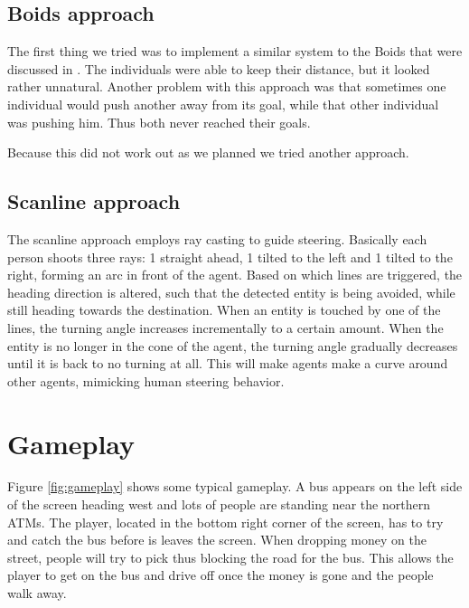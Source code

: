 \documentclass[a4paper,pdf,12pt]{article}
\begin{document}
\subsection{Boids approach}
The first thing we tried was to implement a similar system to the Boids that were discussed in \citep{reynolds1987flocks}. The individuals were able to keep their distance, but it looked rather unnatural. Another problem with this approach was that sometimes one individual would push another away from its goal, while that other individual was pushing him. Thus both never reached their goals.

Because this did not work out as we planned we tried another approach.

\subsection{Scanline approach}
The scanline approach employs ray casting to guide steering. Basically each person shoots three rays: 1 straight ahead, 1 tilted to the left and 1 tilted to the right, forming an arc in front of the agent. Based on which lines are triggered, the heading direction is altered, such that the detected entity is being avoided, while still heading towards the destination. When an entity is touched by one of the lines, the turning angle increases incrementally to a certain amount. When the entity is no longer in the cone of the agent, the turning angle gradually decreases until it is back to no turning at all. This will make agents make a curve around other agents, mimicking human steering behavior.

\section{Gameplay}
\label{sec:Gameplay}
Figure \ref{fig:gameplay} shows some typical gameplay. A bus appears on the left side of the screen heading west and lots of people are standing near the northern ATMs. The player, located in the bottom right corner of the screen, has to try and catch the bus before is leaves the screen. When dropping money on the street, people will try to pick thus blocking the road for the bus. This allows the player to get on the bus and drive off once the money is gone and the people walk away.
\end{document}
